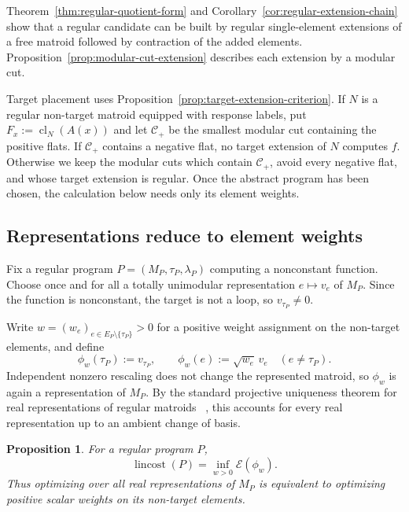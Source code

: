 \documentclass[11pt]{article}
\numberwithin{equation}{section}
\newtheorem{proposition}[definition]{Proposition}
\theoremstyle{remark}
\newcommand{\cl}{\operatorname{cl}}
\begin{document}
Theorem~\ref{thm:regular-quotient-form} and
Corollary~\ref{cor:regular-extension-chain} show that a regular candidate can
be built by regular single-element extensions of a free matroid followed by
contraction of the added elements.  Proposition~\ref{prop:modular-cut-extension}
describes each extension by a modular cut.

Target placement uses Proposition~\ref{prop:target-extension-criterion}.  If
$N$ is a regular non-target matroid equipped with response labels, put
$F_x:=\cl_N(A(x))$ and let $\mathcal C_+$ be the smallest modular cut
containing the positive flats.  If $\mathcal C_+$ contains a negative flat,
no target extension of $N$ computes $f$.  Otherwise we keep the modular cuts
which contain $\mathcal C_+$, avoid every negative flat, and whose target
extension is regular.  Once the abstract program has been chosen, the
calculation below needs only its element weights.

\subsection{Representations reduce to element weights}
\label{subsec:regular-representation-weights}

Fix a regular program
$P=(M_P,\tau_P,\lambda_P)$ computing a nonconstant function. Choose once and for all a totally unimodular representation $e\mapsto v_e$ of $M_P$. Since the function is nonconstant, the target is not a loop, so
$v_{\tau_P}\neq0$.

Write $w=(w_e)_{e\in E_P\setminus\{\tau_P\}}>0$ for a positive weight assignment on the non-target elements, and define
\begin{equation}
    \phi_w(\tau_P):=v_{\tau_P},
    \qquad
    \phi_w(e):=\sqrt{w_e}\,v_e
    \quad(e\neq\tau_P).
\end{equation}
Independent nonzero rescaling does not change the represented matroid, so
$\phi_w$ is again a representation of $M_P$. By the standard projective
uniqueness theorem for real representations of regular matroids
~\cite{BrylawskiLucas1976,Oxley2011}, this accounts for every real
representation up to an ambient change of basis.

\begin{proposition}
\label{prop:regular-representations-are-weights}
For a regular program $P$,
\begin{equation}
    \operatorname{lincost}(P)
    =
    \inf_{w>0}
        \mathcal E(\phi_w).
\end{equation}
Thus optimizing over all real representations of $M_P$ is equivalent to
optimizing positive scalar weights on its non-target elements.
\end{proposition}
\end{document}
